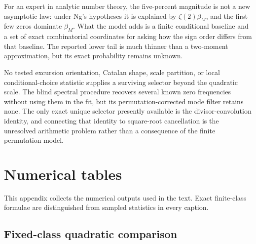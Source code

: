 \documentclass[11pt,reqno]{amsart}
\numberwithin{equation}{section}
\theoremstyle{plain}
\theoremstyle{definition}
\theoremstyle{remark}
\begin{document}
For an expert in analytic number theory, the five-percent magnitude is not a
new asymptotic law: under Ng's hypotheses it is explained by
\(\zeta(2)\beta_M\), and the first few zeros dominate \(\beta_M\).  What the
model adds is a finite conditional baseline and a set of exact combinatorial
coordinates for asking how the sign order differs from that baseline.  The
reported lower tail is much thinner than a two-moment approximation, but its
exact probability remains unknown.

No tested excursion orientation, Catalan shape, scale partition, or local
conditional-choice statistic supplies a surviving selector beyond the
quadratic scale.  The blind spectral procedure recovers several known zero
frequencies without using them in the fit, but its permutation-corrected
mode filter retains none.  The only exact unique selector presently available
is the divisor-convolution identity, and connecting that identity to
square-root cancellation is the unresolved arithmetic problem rather than a
consequence of the finite permutation model.

\appendix

\section{Numerical tables}
\label{app:numerical-results}

This appendix collects the numerical outputs used in the text.  Exact
finite-class formulae are distinguished from sampled statistics in every
caption.

\subsection{Fixed-class quadratic comparison}
\label{subsec:numerical-fixed-class}
\end{document}

